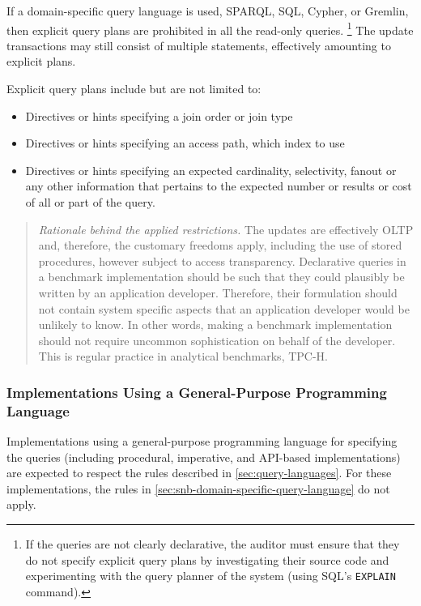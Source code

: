 If a domain-specific query language is used, \eg SPARQL, SQL, Cypher, or Gremlin, then explicit query plans are prohibited in all the read-only queries.%
\footnote{If the queries are not clearly declarative, the auditor must ensure that they do not specify explicit query plans by investigating their source code and experimenting with the query planner of the system (\eg using SQL's \texttt{EXPLAIN} command).}
The update transactions may still consist of multiple statements, effectively amounting to explicit plans.

Explicit query plans include but are not limited to:
\begin{itemize}
    \item Directives or hints specifying a join order or join type
    \item Directives or hints specifying an access path, \eg which index to use
    \item Directives or hints specifying an expected cardinality, selectivity, fanout or any other information that pertains to the expected number or results or cost of all or part of the query.
\end{itemize}

\begin{quote}
    \emph{Rationale behind the applied restrictions.} The updates are effectively OLTP and, therefore, the customary freedoms apply, including the use of stored procedures, however subject to access transparency. Declarative queries in a benchmark implementation should be such that they could plausibly be written by an application developer. Therefore, their formulation should not contain system specific aspects that an application developer would be unlikely to know. In other words, making a benchmark implementation should not require uncommon sophistication on behalf of the developer. This is regular practice in analytical benchmarks, \eg \mbox{TPC-H}.
\end{quote}

\subsubsection{Implementations Using a General-Purpose Programming Language}
\label{sec:snb-general-purpose-programming-language}

Implementations using a general-purpose programming language for specifying the queries (including procedural, imperative, and API-based implementations) are expected to respect the rules described in \autoref{sec:query-languages}.
For these implementations, the rules in \autoref{sec:snb-domain-specific-query-language} do not apply.

